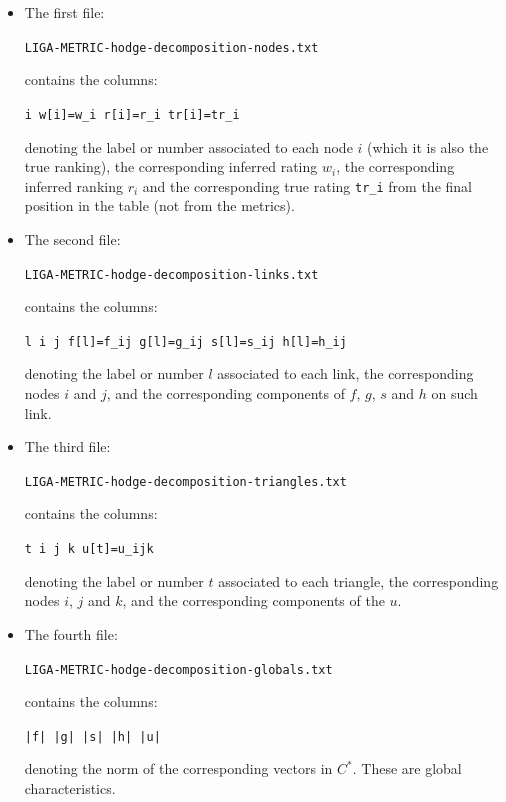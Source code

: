 \documentclass[aps,prl,twocolumn,groupedaddress]{revtex4-2}
\begin{document}
\begin{itemize}

\item The first file:

\quad \verb+LIGA-METRIC-hodge-decomposition-nodes.txt+

\noindent contains the columns:

\quad \verb+i w[i]=w_i r[i]=r_i tr[i]=tr_i+

\noindent denoting the label or number associated to each node $i$ (which it is also the true ranking), the corresponding inferred rating $w_i$, the corresponding inferred ranking $r_i$ and the corresponding true rating \verb+tr_i+ from the final position in the table (not from the metrics).

\item The second file:

\quad \verb+LIGA-METRIC-hodge-decomposition-links.txt+

\noindent contains the columns:

\quad \verb+l i j f[l]=f_ij g[l]=g_ij s[l]=s_ij h[l]=h_ij+

\noindent denoting the label or number $l$ associated to each link, the corresponding nodes $i$ and $j$, and the corresponding components of $f$, $g$, $s$ and $h$ on such link.

\item The third file:

\quad \verb+LIGA-METRIC-hodge-decomposition-triangles.txt+

\noindent contains the columns:

\quad \verb+t i j k u[t]=u_ijk+

\noindent denoting the label or number $t$ associated to each triangle, the corresponding nodes $i$, $j$ and $k$, and the corresponding components of the $u$.

\item The fourth file:

\quad \verb+LIGA-METRIC-hodge-decomposition-globals.txt+

\noindent contains the columns:

\quad \verb+|f| |g| |s| |h| |u|+

\noindent denoting the norm of the corresponding vectors in $C^*$.
These are global characteristics.
\end{itemize}

\end{document}
